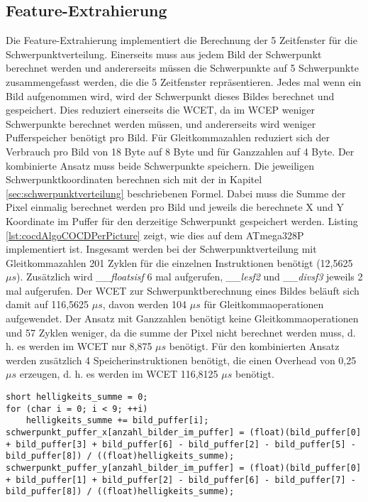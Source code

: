 \subsection{Feature-Extrahierung}
Die Feature-Extrahierung implementiert die Berechnung der 5 Zeitfenster für die Schwerpunktverteilung. Einerseits muss aus jedem Bild der Schwerpunkt berechnet werden und andererseits müssen die Schwerpunkte auf 5
Schwerpunkte zusammengefasst werden, die die 5 Zeitfenster repräsentieren.
\newline
\newline
Jedes mal wenn ein Bild aufgenommen wird, wird der Schwerpunkt dieses Bildes berechnet und gespeichert. Dies reduziert einerseits die WCET, da im WCEP weniger Schwerpunkte berechnet werden müssen, und andererseits
wird weniger Pufferspeicher benötigt pro Bild. Für Gleitkommazahlen reduziert sich der Verbrauch pro Bild von 18 Byte auf 8 Byte und für Ganzzahlen auf 4 Byte. Der kombinierte Ansatz muss beide Schwerpunkte speichern.
Die jeweiligen Schwerpunktkoordinaten berechnen sich mit der in Kapitel \ref{sec:schwerpunktverteilung} beschriebenen Formel. Dabei muss die Summe der Pixel einmalig berechnet werden pro Bild und jeweils die
berechnete X und Y Koordinate im Puffer für den derzeitige Schwerpunkt gespeichert werden. Listing \ref{lst:cocdAlgoCOCDPerPicture} zeigt, wie dies auf dem ATmega328P implementiert ist. Insgesamt werden bei der
Schwerpunktverteilung mit Gleitkommazahlen 201 Zyklen für die einzelnen Instruktionen benötigt (12,5625 $\mu s$). Zusätzlich wird \textit{\_\_floatsisf} 6 mal aufgerufen, \textit{\_\_lesf2} und \textit{\_\_divsf3}
jeweils 2 mal aufgerufen. Der WCET zur Schwerpunktberechnung eines Bildes beläuft sich damit auf 116,5625 $\mu s$, davon werden 104 $\mu s$ für Gleitkommaoperationen aufgewendet. Der Ansatz mit Ganzzahlen benötigt
keine Gleitkommaoperationen und 57 Zyklen weniger, da die summe der Pixel nicht berechnet werden muss, d. h. es werden im WCET nur 8,875 $\mu s$ benötigt. Für den kombinierten Ansatz werden zusätzlich 4
Speicherinstruktionen benötigt, die einen Overhead von 0,25 $\mu s$ erzeugen, d. h. es werden im WCET 116,8125 $\mu s$ benötigt.
\begin{lstlisting}[label=lst:cocdAlgoCOCDPerPicture,caption={Implementierung um den Schwerpunkt für ein Bild zu berechnen.}]
short helligkeits_summe = 0;
for (char i = 0; i < 9; ++i)
    helligkeits_summe += bild_puffer[i];
schwerpunkt_puffer_x[anzahl_bilder_im_puffer] = (float)(bild_puffer[0] + bild_puffer[3] + bild_puffer[6] - bild_puffer[2] - bild_puffer[5] - bild_puffer[8]) / ((float)helligkeits_summe);
schwerpunkt_puffer_y[anzahl_bilder_im_puffer] = (float)(bild_puffer[0] + bild_puffer[1] + bild_puffer[2] - bild_puffer[6] - bild_puffer[7] - bild_puffer[8]) / ((float)helligkeits_summe);
\end{lstlisting}
